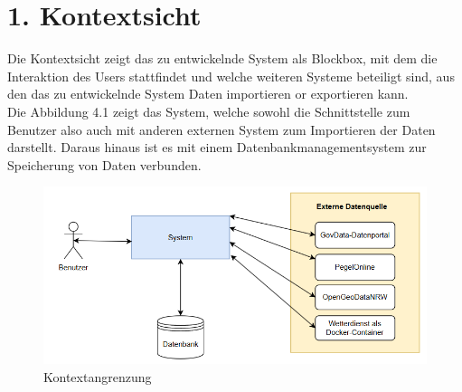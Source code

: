 \documentclass[a4paper,12pt]{scrreprt}
\begin{document}
\section*{\large \textbf{1. Kontextsicht}}
Die Kontextsicht zeigt das zu entwickelnde System als Blockbox, mit dem die Interaktion des Users stattfindet und welche weiteren Systeme beteiligt sind, aus den das zu entwickelnde System Daten importieren or exportieren kann.\\
Die Abbildung 4.1 zeigt das System, welche sowohl die Schnittstelle zum Benutzer  also auch mit anderen externen System zum Importieren der Daten darstellt. Daraus hinaus ist es mit einem Datenbankmanagementsystem zur Speicherung von Daten verbunden.
\begin{figure}[H]
	\centering
	\includegraphics[width=12cm]{Kontextangrenzung.png}
	\caption{\label{} Kontextangrenzung}
\end{figure}
\clearpage
\end{document}
